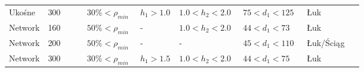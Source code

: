 \begin{table}[hbt!]
\begin{tabular}{@{}p{0.11\linewidth} P{0.11\linewidth} P{0.15\linewidth} P{0.11\linewidth} P{0.18\linewidth} P{0.18\linewidth} P{0.16\linewidth}@{}}
			Ukośne  & 300                  & $30\%<\rho_{min}$ & $h_1>1.0$           & $1.0<h_2<2.0$      & $75<d_1<125$         & Łuk          \\
			Network & 160                  & $50\%<\rho_{min}$      & -                    & $1.0<h_2<2.0$      & $44<d_1<73\ $          & Łuk          \\
			Network & 200                  & $50\%<\rho_{min}$      & -                    & -                    & $45<d_1<110$         & Łuk/Ściąg    \\
			Network & 300                  & $30\%<\rho_{min}$ & $h_1>1.5$           & $1.0<h_2<2.0$      & $44<d_1<75\ $          & Łuk          \\ \bottomrule
	\end{tabular}
	\label{tab:summary_optimization}
\end{table}
